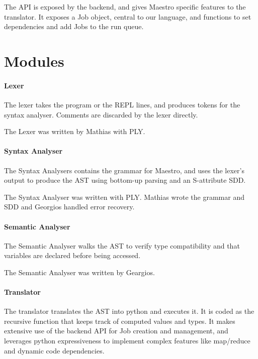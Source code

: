 The API is exposed by the backend, and gives Maestro specific features to the translator.
It exposes a Job object, central to our language, and functions to set dependencies and add Jobs
to the run queue.

\section{Modules}

\paragraph{Lexer}

The lexer takes the program or the REPL lines, and produces tokens for the syntax analyser.
Comments are discarded by the lexer directly.

The Lexer was written by Mathias with PLY.

\paragraph{Syntax Analyser}

The Syntax Analysers contains the grammar for Maestro, and uses the lexer's output to produce the AST using bottom-up parsing and an S-attribute SDD.

The Syntax Analyser was written with PLY. Mathias wrote the grammar and SDD and Georgios handled error recovery.

\paragraph{Semantic Analyser}

The Semantic Analyser walks the AST to verify type compatibility and that variables are declared before being accessed.

The Semantic Analyser was written by Geargios.

\paragraph{Translator}

The translator translates the AST into python and executes it.
It is coded as the recursive function that keeps track of computed values and types.
It makes extensive use of the backend API for Job creation and management, and leverages python expressiveness to implement complex features like map/reduce and dynamic code dependencies.

